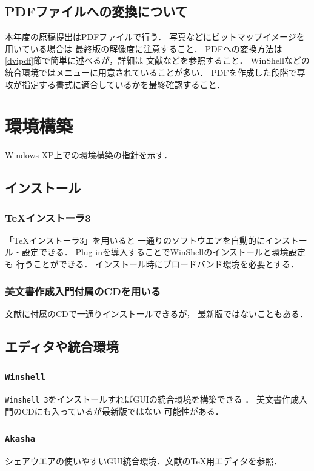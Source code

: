 \documentclass[onecolumn]{jsarticle}
\begin{document}
\subsection{PDFファイルへの変換について}
本年度の原稿提出はPDFファイルで行う．
写真などにビットマップイメージを用いている場合は
最終版の解像度に注意すること．
PDFへの変換方法は\ref{dvipdf}節で簡単に述べるが，詳細は
文献\cite{Kagi,TeXWiki}などを参照すること．
WinShellなどの統合環境ではメニューに用意されていることが多い．
PDFを作成した段階で専攻が指定する書式に適合しているかを最終確認すること．


\section{環境構築}
\label{sec:latexinstall}
Windows XP上での環境構築の指針を示す．

\subsection{\LaTeXe インストール}
\subsubsection{TeXインストーラ3}
「TeXインストーラ3」\cite{texinstaller}を用いると
一通りのソフトウエアを自動的にインストール・設定できる．
Plug-inを導入することでWinShellのインストールと環境設定も
行うことができる．
インストール時にブロードバンド環境を必要とする．
\subsubsection{美文書作成入門付属のCDを用いる}
文献\cite{Okumura2000}に付属のCDで一通りインストールできるが，
最新版ではないこともある．

\subsection{エディタや統合環境}
\subsubsection{\texttt{Winshell}}
\texttt{Winshell 3}をインストールすればGUIの統合環境を構築できる
\cite{TeXWiki}．
美文書作成入門\cite{Okumura2000}のCDにも入っているが最新版ではない
可能性がある．
\subsubsection{\texttt{Akasha}}
シェアウエアの使いやすいGUI統合環境．文献\cite{TeXWiki}のTeX用エディタを参照．
\end{document}
